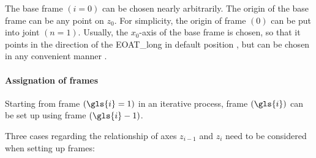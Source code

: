 The base frame $(i=0)$ can be chosen nearly arbitrarily. The origin of the base frame can be any point on $z_0$. For simplicity, the origin of frame $(0)$ can be put into joint $(n=1)$.  Usually, the $x_0$-axis of the base frame is chosen, so that it points in the direction of the \gls{EOAT_long} in default position \cite{DenavitHartenbergKonventionen}, but can be chosen in any convenient manner \cite{SpongDynContr}.

\paragraph{Assignation of frames }

Starting from frame $(\gls{i}=1)$ in an iterative process, frame $(\gls{i})$ can be set up using frame $(\gls{i}-1)$.

Three cases regarding the relationship of axes $z_{i-1}$ and $z_i$  need to be considered when setting up frames:
